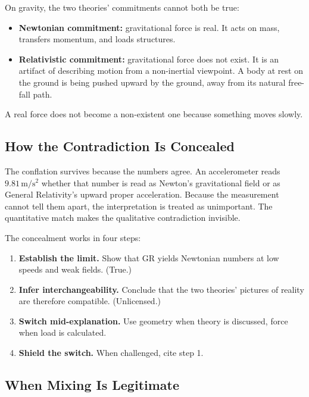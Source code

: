 \documentclass[11pt,a4paper]{article}
\begin{document}
On gravity, the two theories' commitments cannot both be true:

\begin{itemize}
  \item \textbf{Newtonian commitment:} gravitational force is real. It acts on mass, transfers momentum, and loads structures.
  \item \textbf{Relativistic commitment:} gravitational force does not exist. It is an artifact of describing motion from a non-inertial viewpoint. A body at rest on the ground is being pushed upward by the ground, away from its natural free-fall path.
\end{itemize}

A real force does not become a non-existent one because something moves slowly. 

\subsection{How the Contradiction Is Concealed}

The conflation survives because the numbers agree. An accelerometer reads $9.81\,\mathrm{m/s^2}$ whether that number is read as Newton's gravitational field or as General Relativity's upward proper acceleration. Because the measurement cannot tell them apart, the interpretation is treated as unimportant. The quantitative match makes the qualitative contradiction invisible.

The concealment works in four steps:

\begin{enumerate}
  \item \textbf{Establish the limit.} Show that GR yields Newtonian numbers at low speeds and weak fields. (True.)
  \item \textbf{Infer interchangeability.} Conclude that the two theories' pictures of reality are therefore compatible. (Unlicensed.)
  \item \textbf{Switch mid-explanation.} Use geometry when theory is discussed, force when load is calculated.
  \item \textbf{Shield the switch.} When challenged, cite step 1.
\end{enumerate}

\subsection{When Mixing Is Legitimate}
\end{document}
